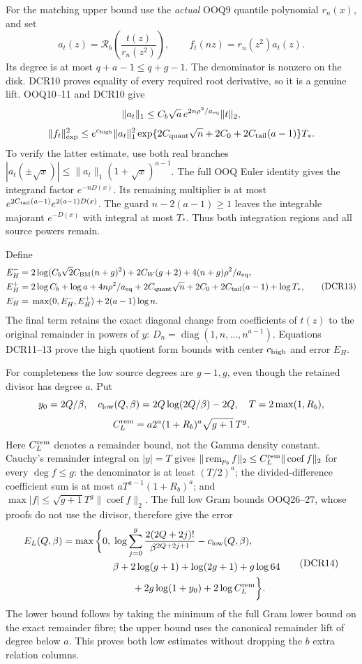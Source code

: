 \documentclass[11pt]{article}
\begin{document}
For the matching upper bound use the \emph{actual} OOQ9 quantile
polynomial \(r_n(x)\), and set
\[
a_t(z)=\mathcal R_b\!\left(\frac{t(z)}{r_n(z^2)}\right),\qquad
f_t(nz)=r_n(z^2)a_t(z).
\tag{DCR12}
\]
Its degree is at most \(q+a-1\le q+g-1\).
The denominator is nonzero on the disk. DCR10 proves equality
of every required root derivative, so it is a genuine lift.
OOQ10--11 and DCR10 give
\[
\|a_t\|_1\le C_b\sqrt a\,e^{2n\rho^2/a_{\rm eq}}\|t\|_2,
\]
\[
\|f_t\|_{\exp}^2\le e^{c_{\rm high}}\|a_t\|_1^2
 \exp\{2C_{\rm quant}\sqrt n+2C_0+2C_{\rm tail}(a-1)\}T_*.
\]
To verify the latter estimate, use both real branches
\(|a_t(\pm\sqrt x)|\le\|a_t\|_1(1+\sqrt x)^{a-1}\).
The full OOQ Euler identity gives the integrand factor
\(e^{-nD(x)}\). Its remaining multiplier is at most
\(e^{2C_{\rm tail}(a-1)}e^{2(a-1)D(x)}\).
The guard \(n-2(a-1)\ge1\) leaves the integrable majorant
\(e^{-D(x)}\) with integral at most \(T_*\).
Thus both integration regions and all source powers remain.

Define
\[
\begin{split}
E_H^-={}&2\log(C_b\sqrt2 C_{\rm BM}(n+g)^2)
 +2C_W(g+2)+4(n+g)\rho^2/a_{\rm eq},\\
E_H^+={}&2\log C_b+\log a+4n\rho^2/a_{\rm eq}
 +2C_{\rm quant}\sqrt n+2C_0+2C_{\rm tail}(a-1)+\log T_*,\\
E_H={}&\max(0,E_H^-,E_H^+)+2(a-1)\log n .
\end{split}\tag{DCR13}
\]
The final term retains the exact diagonal change from coefficients
of \(t(z)\) to the original remainder in powers of \(y\):
\(D_n=\operatorname{diag}(1,n,\ldots,n^{a-1})\).
Equations DCR11--13 prove the high quotient form bounds with center
\(c_{\rm high}\) and error \(E_H\).

For completeness the low source degrees are \(g-1,g\), even though
the retained divisor has degree \(a\). Put
\[
y_0=2Q/\beta,\quad c_{\rm low}(Q,\beta)=2Q\log(2Q/\beta)-2Q,
\quad T=2\max(1,R_b),
\]
\[
 C_L^{\rm rem}=a2^a(1+R_b)^a\sqrt{g+1}\,T^g.
\]
Here \(C_L^{\rm rem}\) denotes a remainder bound, not the Gamma
density constant. Cauchy's remainder integral on \(|y|=T\)
gives \(\|\operatorname{rem}_{p_b}f\|_2
\le C_L^{\rm rem}\|\operatorname{coef}f\|_2\) for every
\(\deg f\le g\): the denominator is at least \((T/2)^a\);
the divided-difference coefficient sum is at most
\(aT^{a-1}(1+R_b)^a\); and
\(\max|f|\le\sqrt{g+1}T^g\|\operatorname{coef}f\|_2\).
The full low Gram bounds OOQ26--27, whose proofs do not use
the divisor, therefore give the error
\[
\begin{split}
E_L(Q,\beta)=\max\bigg\{0,\;&
 \log\sum_{j=0}^g\frac{2(2Q+2j)!}{\beta^{2Q+2j+1}}
       -c_{\rm low}(Q,\beta),\\
 &\beta+2\log(g+1)+\log(2g+1)+g\log64\\
 &\qquad+2g\log(1+y_0)+2\log C_L^{\rm rem}\bigg\}.
\end{split}\tag{DCR14}
\]
The lower bound follows by taking the minimum of the full Gram
lower bound on the exact remainder fibre; the upper bound uses
the canonical remainder lift of degree below \(a\).
This proves both low estimates without dropping the \(b\) extra
relation columns.
\end{document}
